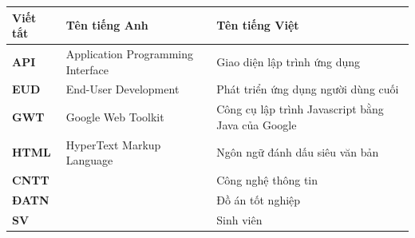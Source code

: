 \documentclass[../DoAn.tex]{subfiles}
\begin{document}
\begin{longtable}{l L{6cm} L{7cm}}
	\hline
   \textbf{Viết tắt}  & \textbf{Tên tiếng Anh}	& \textbf{Tên tiếng Việt} \\ \hline 
	\textbf{API} & Application Programming Interface & Giao diện lập trình ứng dụng\\
	\textbf{EUD} & End-User Development & Phát triển ứng dụng người dùng cuối\\
	\textbf{GWT} & Google Web Toolkit & Công cụ lập trình Javascript bằng Java của Google\\
	\textbf{HTML} & HyperText Markup Language & Ngôn ngữ đánh dấu siêu văn bản\\
	\textbf{CNTT }  &   & Công nghệ thông tin\\
	\textbf{ĐATN} &  & Đồ án tốt nghiệp \\
	\textbf{SV} &  & Sinh viên \\

    \hline
\end{longtable}
\end{document}
